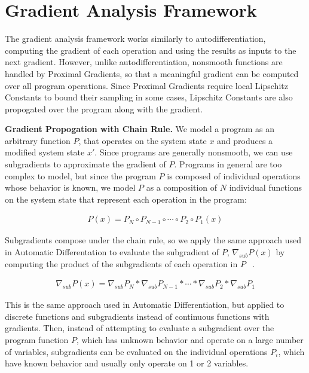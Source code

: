 \section{Gradient Analysis Framework}

The gradient analysis framework works similarly to autodifferentiation, computing the gradient of each operation and using the results as inputs to the next gradient. However, unlike autodifferentiation, nonsmooth functions are handled by Proximal Gradients, so that a meaningful gradient can be computed over all program operations. Since Proximal Gradients require local Lipschitz Constants to bound their sampling in some cases, Lipschitz Constants are also propogated over the program along with the gradient.

\noindent \textbf{Gradient Propogation with Chain Rule.} We model a program as an arbitrary function $P$, that operates on the system state $x$ and produces a modified system state $x'$. Since programs are generally nonsmooth, we can use subgradients to approximate the gradient of $P$. Programs in general are too complex to model, but since the program $P$ is composed of individual operations whose behavior is known, we model $P$ as a composition of $N$ individual functions on the system state that represent each operation in the program:

\vspace{-10pt}\begin{align*}
P(x) = P_N \circ P_{N-1} \circ \cdots \circ P_2 \circ P_1 (x)
\end{align*}

Subgradients compose under the chain rule, so we apply the same approach used in Automatic Differentation to evaluate the subgradient of $P$,  $\nabla_{sub} P(x)$ by computing the product of the subgradients of each operation in $P$ ~\cite{rockafellar2009variational}. 

\vspace{-10pt}\begin{align*}
  \nabla_{sub} P(x) = \nabla_{sub} P_N * \nabla_{sub} P_{N-1} * \cdots * \nabla_{sub} P_2 * \nabla_{sub} P_1
\end{align*}

This is the same approach used in Automatic Differentiation, but applied to discrete functions and subgradients instead of continuous functions with gradients. Then, instead of attempting to evaluate a subgradient over the program function $P$, which has unknown behavior and operate on a large number of variables, subgradients can be evaluated on the individual operations $P_i$, which have known behavior and usually only operate on 1 or 2 variables.

